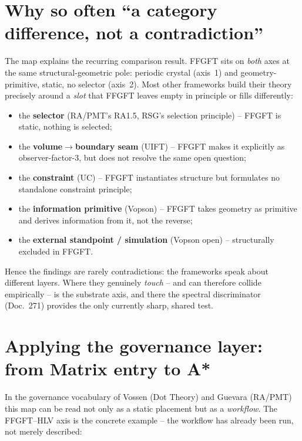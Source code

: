 \section{Why so often \enquote{a category difference, not a contradiction}}

The map explains the recurring comparison result. FFGFT sits on \emph{both} axes at the same
structural-geometric pole: periodic crystal (axis~1) and geometry-primitive, static, no selector
(axis~2). Most other frameworks build their theory precisely around a \emph{slot} that FFGFT
leaves empty in principle or fills differently:

\begin{itemize}
  \item the \textbf{selector} (RA/PMT's RA1.5, RSG's selection principle) -- FFGFT is static,
        nothing is selected;
  \item the \textbf{volume$\to$boundary seam} (UIFT) -- FFGFT makes it explicitly as
        observer-factor-3, but does not resolve the same open question;
  \item the \textbf{constraint} (UC) -- FFGFT instantiates structure but formulates no standalone
        constraint principle;
  \item the \textbf{information primitive} (Vopson) -- FFGFT takes geometry as primitive and
        derives information from it, not the reverse;
  \item the \textbf{external standpoint / simulation} (Vopson open) -- structurally excluded in
        FFGFT.
\end{itemize}

Hence the findings are rarely contradictions: the frameworks speak about different layers. Where
they genuinely \emph{touch} -- and can therefore collide empirically -- is the substrate axis, and
there the spectral discriminator (Doc.~271) provides the only currently sharp, shared test.

\section{Applying the governance layer: from Matrix entry to A*}

In the governance vocabulary of Vossen (Dot Theory) and Guevara (RA/PMT) this map can be read not
only as a static placement but as a \emph{workflow}. The FFGFT--HLV axis is the concrete example --
the workflow has already been run, not merely described:


